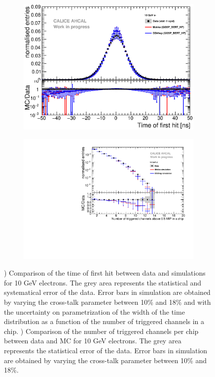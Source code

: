 \documentclass{JINST}
\begin{document}
\begin{figure}[htbp!]
	\centering
	\begin{subfigure}[t]{0.49\textwidth}
		\includegraphics[width=1\textwidth]{fig/Comparison_SimData_Electrons10GeV.eps}
		\caption{}\label{fig:elec_sim_data_10GeV}
	\end{subfigure}
	\hfill
	\begin{subfigure}[t]{0.49\textwidth}
		\includegraphics[width=1\textwidth]{fig/Comparison_SimData_Electrons_nHits_10GeV.pdf}
		\caption{}\label{fig:elec_sim_data_nHits_10GeV}
	\end{subfigure}
	\caption{) Comparison of the time of first hit between data and simulations for 10 GeV electrons. The grey area represents the statistical and systematical error of the data. Error bars in simulation are obtained by varying the cross-talk parameter between 10\% and 18\% and with the uncertainty on parametrization of the width of the time distribution as a function of the number of triggered channels in a chip. ) Comparison of the number of triggered channels per chip between data and MC for 10 GeV electrons. The grey area represents the statistical error of the data. Error bars in simulation are obtained by varying the cross-talk parameter between 10\% and 18\%.}
\end{figure}
\end{document}
